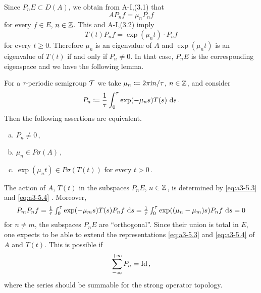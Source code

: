 Since $P_{n}E \subset D(A)$, we obtain from A-I,(3.1) that
\begin{equation}\label{eq:a3-5.3}
AP_{n}f = \mu_{n}P_{n}f
\end{equation}
for every $f \in E$, $n \in \mathbb{Z}$.
This and A-I,(3.2) imply
\begin{equation}\label{eq:a3-5.4}
T(t)P_{n}f = \exp(\mu_{n}t) \cdot P_{n}f
\end{equation}
for every $t \geq 0$.
Therefore $\mu_{n}$ is an eigenvalue of $A$ and $\exp(\mu_{n}t)$ is an eigenvalue of $T(t)$ if and only if $P_{n} \neq 0$.
In that case, $P_{n}E$ is the corresponding eigenspace and we have the following lemma.
\begin{lemma}\label{lem:a3-5.3}
For a $\tau$-periodic semigroup $\mathcal{T}$ we take $\mu_{n} \coloneqq 2\pi\mathrm{i} n/\tau$, $n \in \mathbb{Z}$, and consider
\[
P_{n} \coloneqq \frac{1}{\tau}\int_{0}^{\tau} \exp(-\mu_{n}s)T(s) \, \mathop{}\!\mathrm{d}{s}\,.
\]
Then the following assertions are equivalent.
\begin{enumerate}[(a)]
\item 
$P_{n} \neq 0$\,,

\item 
$\mu_{n} \in P\sigma(A)$\,,

\item 
$\exp(\mu_{n}t) \in P\sigma(T(t))$ for every $t > 0$\,.

\end{enumerate}
\end{lemma}
The action of $A$, \resp $T(t)$ in the subspaces $P_{n}E$, $n \in \mathbb{Z}$, is determined by \eqref{eq:a3-5.3} and \eqref{eq:a3-5.4} \resp.
Moreover,
\[\textstyle
P_{m}P_{n}f =  \frac{1}{\tau}\int_{0}^{\tau} \exp(-\mu_{m}s)T(s)P_{n}f \, \mathop{}\!\mathrm{d}{s} 
=  \frac{1}{\tau}\int_{0}^{\tau} \exp((\mu_{n}-\mu_{m})s)P_{n}f \, \mathop{}\!\mathrm{d}{s} = 0
\]
for $n \neq m$, \ie the subspaces $P_{n}E$ are \enquote{orthogonal}.
Since their union is total in $E$, one expects to be able to extend the representations \eqref{eq:a3-5.3} and \eqref{eq:a3-5.4} of $A$ and $T(t)$.
This is possible if
\[
\sum_{-\infty}^{+\infty} P_{n} = \operatorname{Id}\,,
\]
where the series should be summable for the strong operator topology.

